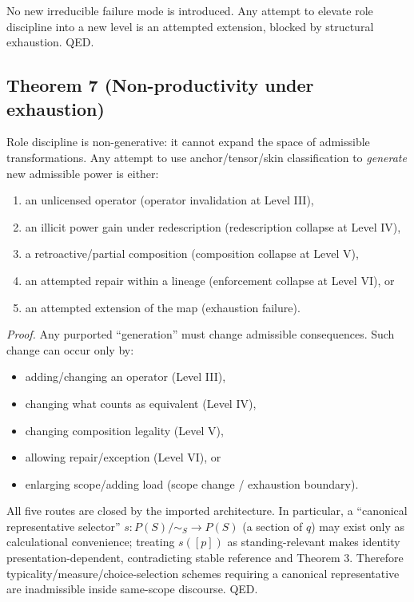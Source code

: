 \documentclass[12pt]{article}
\theoremstyle{plain}
\begin{document}
No new irreducible failure mode is introduced. Any attempt to elevate role discipline into a new level is an attempted extension, blocked by structural exhaustion. QED.

\subsection{Theorem 7 (Non-productivity under exhaustion)}

Role discipline is non-generative: it cannot expand the space of admissible transformations. Any attempt to use anchor/tensor/skin classification to \emph{generate} new admissible power is either:

\begin{enumerate}[leftmargin=*]
\item an unlicensed operator (operator invalidation at Level III),
\item an illicit power gain under redescription (redescription collapse at Level IV),
\item a retroactive/partial composition (composition collapse at Level V),
\item an attempted repair within a lineage (enforcement collapse at Level VI), or
\item an attempted extension of the map (exhaustion failure).
\end{enumerate}

\textit{Proof.} Any purported ``generation'' must change admissible consequences. Such change can occur only by:

\begin{itemize}[leftmargin=*]
\item adding/changing an operator (Level III),
\item changing what counts as equivalent (Level IV),
\item changing composition legality (Level V),
\item allowing repair/exception (Level VI), or
\item enlarging scope/adding load (scope change / exhaustion boundary).
\end{itemize}

All five routes are closed by the imported architecture. In particular, a ``canonical representative selector'' $s:P(S)/\sim_S\to P(S)$ (a section of $q$) may exist only as calculational convenience; treating $s([p])$ as standing-relevant makes identity presentation-dependent, contradicting stable reference and Theorem 3. Therefore typicality/measure/choice-selection schemes requiring a canonical representative are inadmissible inside same-scope discourse. QED.
\end{document}
